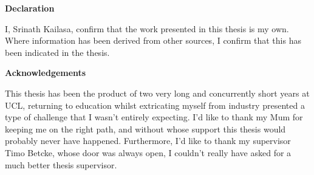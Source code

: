\thispagestyle{plain}

\begin{center}
    \textbf{Declaration}
\end{center}
I, Srinath Kailasa, confirm that the work presented in this thesis is my own. Where information has been derived from other
sources, I confirm that this has been indicated in the thesis.


\begin{center}
    \textbf{Acknowledgements}
\end{center}

This thesis has been the product of two very long and concurrently short years
at UCL, returning to education whilst extricating myself from industry presented a type of
challenge that I wasn't entirely expecting. I'd like to thank my Mum for keeping
me on the right path, and without whose support this thesis would probably never
have happened. Furthermore, I'd like to thank my supervisor Timo Betcke, whose door
was always open, I couldn't really have asked for a much better thesis supervisor.
